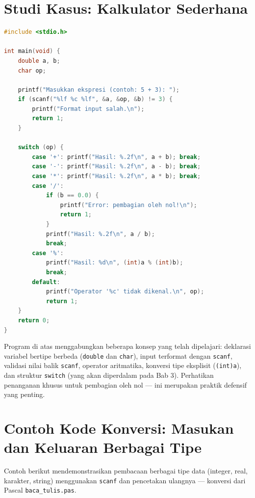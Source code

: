 \documentclass[../main.tex]{subfiles}
\begin{document}
\section{Studi Kasus: Kalkulator Sederhana}

\begin{lstlisting}[language=C,caption=Kalkulator dua bilangan]
#include <stdio.h>

int main(void) {
    double a, b;
    char op;
    
    printf("Masukkan ekspresi (contoh: 5 + 3): ");
    if (scanf("%lf %c %lf", &a, &op, &b) != 3) {
        printf("Format input salah.\n");
        return 1;
    }
    
    switch (op) {
        case '+': printf("Hasil: %.2f\n", a + b); break;
        case '-': printf("Hasil: %.2f\n", a - b); break;
        case '*': printf("Hasil: %.2f\n", a * b); break;
        case '/':
            if (b == 0.0) {
                printf("Error: pembagian oleh nol!\n");
                return 1;
            }
            printf("Hasil: %.2f\n", a / b);
            break;
        case '%':
            printf("Hasil: %d\n", (int)a % (int)b);
            break;
        default:
            printf("Operator '%c' tidak dikenal.\n", op);
            return 1;
    }
    return 0;
}
\end{lstlisting}

Program di atas menggabungkan beberapa konsep yang telah dipelajari: deklarasi variabel bertipe berbeda (\texttt{double} dan \texttt{char}), input terformat dengan \texttt{scanf}, validasi nilai balik \texttt{scanf}, operator aritmatika, konversi tipe eksplisit (\texttt{(int)a}), dan struktur \texttt{switch} (yang akan diperdalam pada Bab 3). Perhatikan penanganan khusus untuk pembagian oleh nol --- ini merupakan praktik defensif yang penting.

\section{Contoh Kode Konversi: Masukan dan Keluaran Berbagai Tipe}

Contoh berikut mendemonstrasikan pembacaan berbagai tipe data (integer, real, karakter, string) menggunakan \texttt{scanf} dan pencetakan ulangnya --- konversi dari Pascal \texttt{baca\_tulis.pas}.
\end{document}
